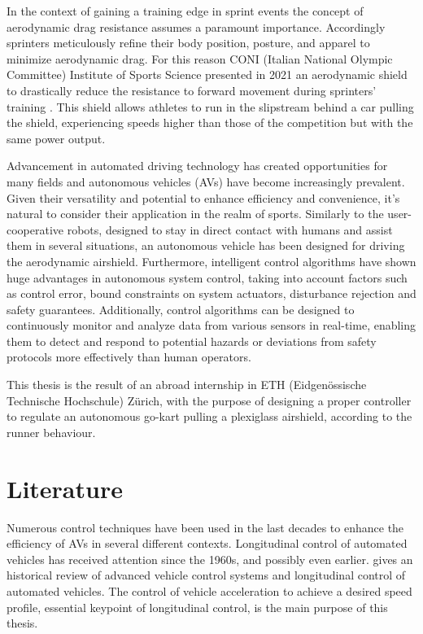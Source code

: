 \documentclass[a4paper,12pt,oneside]{book}
\begin{document}
In the context of gaining a training edge in sprint events the concept of aerodynamic drag resistance assumes a paramount importance. 
Accordingly sprinters meticulously refine their body position, posture, and apparel to minimize aerodynamic drag. 
For this reason CONI (Italian National Olympic Committee) Institute of Sports Science presented in 2021 an aerodynamic shield to drastically reduce the resistance to forward movement  during sprinters' training \cite{Coni_article}. 
This shield allows athletes to run in the slipstream behind a car pulling the shield, experiencing speeds higher than those of the competition but with the same power output. 
\bigskip

Advancement in automated driving technology has created opportunities for many fields and autonomous vehicles (AVs) have become increasingly prevalent. 
Given their versatility and potential to enhance efficiency and convenience, it's natural to consider their application in the realm of sports. 
Similarly to the user-cooperative robots, designed to stay in direct contact with humans and assist them in several situations, an autonomous vehicle has been designed for driving the aerodynamic airshield. 
Furthermore, intelligent control algorithms have shown huge advantages in autonomous system control, taking into account factors such as control error, bound constraints on system actuators, disturbance rejection and safety guarantees. Additionally, control algorithms can be designed to continuously monitor and analyze data from various sensors in real-time, enabling them to detect and respond to potential hazards or deviations from safety protocols more effectively than human operators.
\bigskip

This thesis is the result of an abroad internship in ETH (Eidgen\"ossische Technische Hochschule) Z\"urich, with the purpose of designing a proper controller to regulate an autonomous go-kart pulling a plexiglass airshield, according to the runner behaviour.

		
\section*{Literature}
Numerous control techniques have been used in the last decades to enhance the efficiency of AVs in several different contexts.
Longitudinal control of automated vehicles has received attention since the 1960s, and possibly even earlier.
\cite{Review_AVCS} gives an historical review of advanced vehicle control systems and longitudinal control of automated vehicles. 
The control of vehicle acceleration to achieve a desired speed profile, essential keypoint of longitudinal control, is the main purpose of this thesis.
\end{document}

